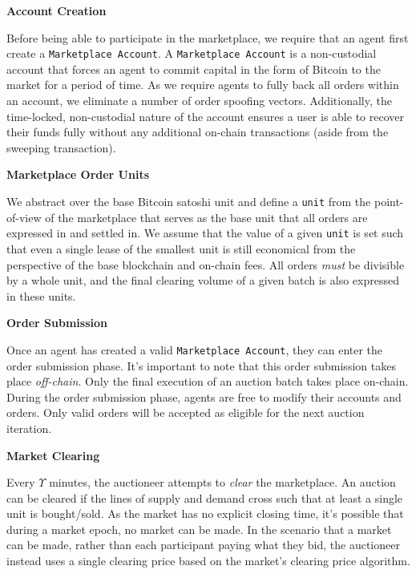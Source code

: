 \documentclass[10pt,a4paper]{article}
\theoremstyle{definition}
\begin{document}
\begin{center}
    \textbf{Account Creation}
\end{center}

Before being able to participate in the marketplace, we require that an agent
first create a \texttt{Marketplace Account}. A \texttt{Marketplace Account} is
a non-custodial account that forces an agent to commit capital in the form of
Bitcoin to the market for a period of time. As we require agents to fully back
all orders within an account, we eliminate a number of order spoofing vectors.
Additionally, the time-locked, non-custodial nature of the account ensures a user
is able to recover their funds fully without any additional on-chain
transactions (aside from the sweeping transaction).

\begin{center}
    \textbf{Marketplace Order Units}
\end{center}

We abstract over the base Bitcoin satoshi unit and define a \texttt{unit} from
the point-of-view of the marketplace that serves as the base unit that all
orders are expressed in and settled in. We assume that the value of a given
\texttt{unit} is set such that even a single lease of the smallest unit is
still economical from the perspective of the base blockchain and on-chain fees.
All orders \emph{must} be divisible by a whole unit, and the final clearing
volume of a given batch is also expressed in these units.

\begin{center}
    \textbf{Order Submission}
\end{center}

Once an agent has created a valid \texttt{Marketplace Account}, they can enter
the order submission phase. It's important to note that this order submission
takes place \emph{off-chain}. Only the final execution of an auction batch
takes place on-chain. During the order submission phase, agents are free to
modify their accounts and orders. Only valid orders will be accepted as
eligible for the next auction iteration.

\begin{center}
    \textbf{Market Clearing}
\end{center}

Every $\Upsilon$ minutes, the auctioneer attempts to \emph{clear} the
marketplace.  An auction can be cleared if the lines of supply and demand cross
such that at least a single unit is bought/sold. As the market has no explicit
closing time, it's possible that during a market epoch, no market can be made.
In the scenario that a market can be made, rather than each participant paying
what they bid, the auctioneer instead uses a single clearing price based on the
market's clearing price algorithm.
\end{document}
